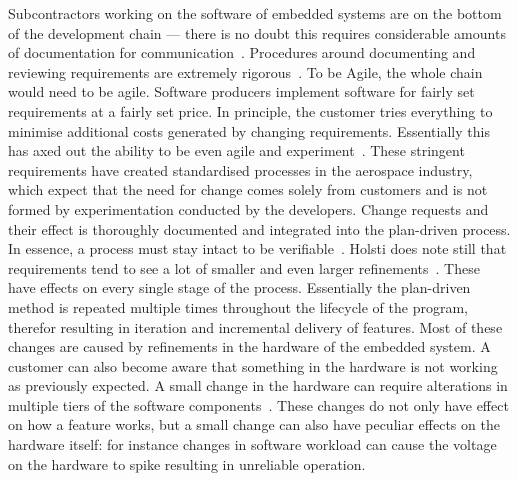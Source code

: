 \documentclass[english]{tktltiki2}
\begin{document}
Subcontractors working on the software of embedded systems are on the bottom of the development chain — there is no doubt this requires considerable amounts of documentation for communication~\cite{Hol15b}. Procedures around documenting and reviewing requirements are extremely rigorous~\cite{Hol15b}. To be Agile, the whole chain would need to be agile. Software producers implement software for fairly set requirements at a fairly set price. In principle, the customer tries everything to minimise additional costs generated by changing requirements. Essentially this has axed out the ability to be even agile and experiment~\cite{Hol15b}. These stringent requirements have created standardised processes in the aerospace industry, which expect that the need for change comes solely from customers and is not formed by experimentation conducted by the developers. Change requests and their effect is thoroughly documented and integrated into the plan-driven process. In essence, a process must stay intact to be verifiable~\cite{Hol15b}. Holsti does note still that requirements tend to see a lot of smaller and even larger refinements~\cite{Hol15b}. These have effects on every single stage of the process. Essentially the plan-driven method is repeated multiple times throughout the lifecycle of the program, therefor resulting in iteration and incremental delivery of features. Most of these changes are caused by refinements in the hardware of the embedded system. A customer can also become aware that something in the hardware is not working as previously expected. A small change in the hardware can require alterations in multiple tiers of the software components~\cite{Hol15b}. These changes do not only have effect on how a feature works, but a small change can also have peculiar effects on the hardware itself: for instance changes in software workload can cause the voltage on the hardware to spike resulting in unreliable operation.
\end{document}
